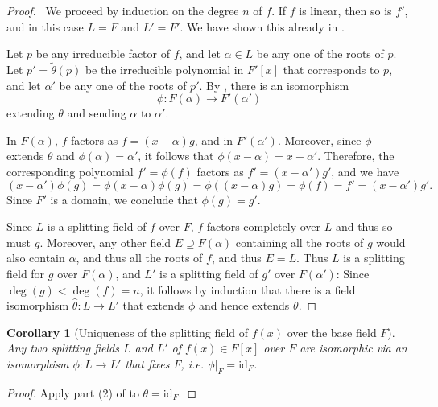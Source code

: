 \documentclass[12pt]{report}
\newtheorem{corollary}[theorem]{Corollary}
\numberwithin{equation}{section}
\numberwithin{theorem}{chapter}
\theoremstyle{definition}
\newtheorem*{basic properties}{Basic Properties}
\newtheorem*{Important Remark}{Important Remark}
\begin{document}
\begin{proof}$\,$
 We proceed by induction on the degree $n$ of $f$.
If $f$ is linear, then so is $f'$, and in this case $L = F$ and $L' = F'$. We have shown this already in .


Let $p$ be any irreducible factor of $f$, and let $\alpha \in L$ be any one
of the roots of $p$.
Let $p'=\tilde\theta(p)$ be the irreducible polynomial in $F'[x]$ that
corresponds to $p$, and let $\alpha'$ be any one
of the roots of $p'$. By , there is an isomorphism 
$$\phi\!: F(\alpha) \to F'(\alpha')$$ 
extending $\theta$ and sending $\alpha$ to $\alpha'$.

In $F(\alpha)$, $f$ factors as $f = (x-\alpha) g$, and in $F'(\alpha')$. Moreover, since $\phi$ extends $\theta$ and $\phi(\alpha) = \alpha'$, it follows that $\phi(x-\alpha)= x- \alpha'$. Therefore, the corresponding polynomial $f' = \phi(f)$ factors as $f' = (x- \alpha') g'$, and we have
$$(x-\alpha') \phi(g) = \phi(x-\alpha) \phi(g) = \phi((x-\alpha) g) = \phi(f) = f' = (x-\alpha') g'.$$
Since $F'$ is a domain, we conclude that $\phi(g) = g'$.



Since $L$ is a splitting field of $f$ over $F$, $f$ factors completely over $L$ and thus so must $g$. Moreover, any other field $E \supseteq F(\alpha)$ containing all the roots of $g$ would also contain $\alpha$, and thus all the roots of $f$, and thus $E = L$.
Thus $L$ is a splitting field for $g$ over $F(\alpha)$, and $L'$ is a splitting field of $g'$ over $F(\alpha')$:
Since $\deg(g) < \deg(f) = n$, it follows by induction that there is a field isomorphism $\widehat{\theta}: L \to L'$ that extends $\phi$ and hence extends $\theta$.
\end{proof}




\begin{corollary}[Uniqueness of the splitting field of $f(x)$ over the base field $F$]\label{uniqueness of splitting fields}
Any two splitting fields $L$ and $L'$ of $f(x) \in F[x]$ over $F$ are isomorphic  via an isomorphism $\phi:L\to L'$ that fixes $F$, i.e. $\phi|_F=\mathrm{id}_F$.
\end{corollary}

\begin{proof}
Apply part (2) of  to $\theta=\mathrm{id}_F$.
\end{proof}
\end{document}
